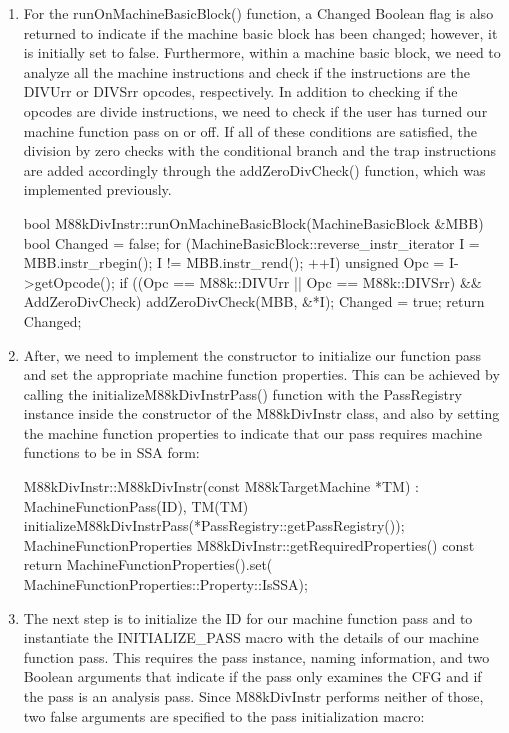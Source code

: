 \begin{enumerate}
\item
For the runOnMachineBasicBlock() function, a Changed Boolean flag is also returned to indicate if the machine basic block has been changed; however, it is initially set to false. Furthermore, within a machine basic block, we need to analyze all the machine instructions and check if the instructions are the DIVUrr or DIVSrr opcodes, respectively. In addition to checking if the opcodes are divide instructions, we need to check if the user has turned our machine function pass on or off. If all of these conditions are satisfied, the division by zero checks with the conditional branch and the trap instructions are added accordingly through the addZeroDivCheck() function, which was implemented previously.

\begin{cpp}
bool M88kDivInstr::runOnMachineBasicBlock(MachineBasicBlock
&MBB) {
    bool Changed = false;
    for (MachineBasicBlock::reverse_instr_iterator I =
    MBB.instr_rbegin();
            I != MBB.instr_rend(); ++I) {
        unsigned Opc = I->getOpcode();
        if ((Opc == M88k::DIVUrr || Opc == M88k::DIVSrr) &&
        AddZeroDivCheck) {
            addZeroDivCheck(MBB, &*I);
            Changed = true;
        }
    }
    return Changed;
}
\end{cpp}

\item
After, we need to implement the constructor to initialize our function pass and set the appropriate machine function properties. This can be achieved by calling the initializeM88kDivInstrPass() function with the PassRegistry instance inside the constructor of the M88kDivInstr class, and also by setting the machine function properties to indicate that our pass requires machine functions to be in SSA form:

\begin{cpp}
M88kDivInstr::M88kDivInstr(const M88kTargetMachine *TM)
: MachineFunctionPass(ID), TM(TM) {
    initializeM88kDivInstrPass(*PassRegistry::getPassRegistry());
}
MachineFunctionProperties M88kDivInstr::getRequiredProperties()
const {
    return MachineFunctionProperties().set(
        MachineFunctionProperties::Property::IsSSA);
}
\end{cpp}

\item
The next step is to initialize the ID for our machine function pass and to instantiate the INITIALIZE\_PASS macro with the details of our machine function pass. This requires the pass instance, naming information, and two Boolean arguments that indicate if the pass only examines the CFG and if the pass is an analysis pass. Since M88kDivInstr performs neither of those, two false arguments are specified to the pass initialization macro:


\end{enumerate}

